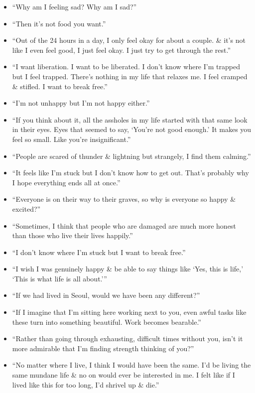 \documentclass{article}
\begin{document}
\begin{enumerate}
\begin{itemize}
		``I drink to feel calm.'' -- Mr. Gu
		\item ``Why am I feeling sad? Why am I sad?''
		\item ``Then it's not food you want.''
		\item ``Out of the 24 hours in a day, I only feel okay for about a couple. \& it's not like I even feel good, I just feel okay. I just try to get through the rest.''
		\item ``I want liberation. I want to be liberated. I don't know where I'm trapped but I feel trapped. There's nothing in my life that relaxes me. I feel cramped \& stifled. I want to break free.''
		\item ``I'm not unhappy but I'm not happy either.''
		\item ``If you think about it, all the assholes in my life started with that same look in their eyes. Eyes that seemed to say, `You're not good enough.' It makes you feel so small. Like you're insignificant.''
		\item ``People are scared of thunder \& lightning but strangely, I find them calming.''
		\item ``It feels like I'm stuck but I don't know how to get out. That's probably why I hope everything ends all at once.''
		\item ``Everyone is on their way to their graves, so why is everyone so happy \& excited?''
		\item ``Sometimes, I think that people who are damaged are much more honest than those who live their lives happily.''
		\item ``I don't know where I'm stuck but I want to break free.''
		\item ``I wish I was genuinely happy \& be able to say things like `Yes, this is life,' `This is what life is all about.'''
		\item ``If we had lived in Seoul, would we have been any different?''
		\item ``If I imagine that I'm sitting here working next to you, even awful tasks like these turn into something beautiful. Work becomes bearable.''
		\item ``Rather than going through exhausting, difficult times without you, isn't it more admirable that I'm finding strength thinking of you?''
		\item ``No matter where I live, I think I would have been the same. I'd be living the same mundane life \& no on would ever be interested in me. I felt like if I lived like this for too long, I'd shrivel up \& die.''

\end{itemize}
\end{enumerate}
\end{document}
